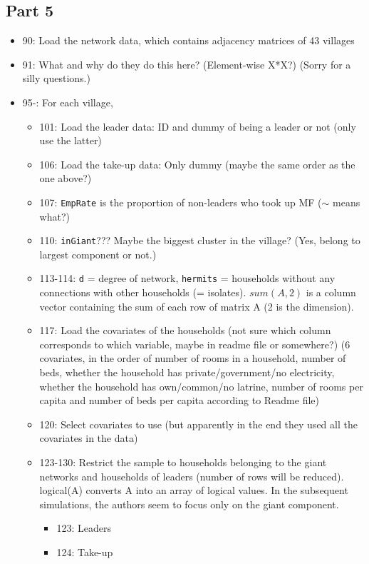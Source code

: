 \documentclass[10pt,letterpaper]{article}
\begin{document}
\subsection*{Part 5}
\begin{itemize}
  \item 90: Load the network data, which contains adjacency matrices of 43 villages
  \item 91: What and why do they do this here? (Element-wise X*X?) (Sorry for a silly questions.)
  \item 95-: For each village,
    \begin{itemize}
      \item 101: Load the leader data: ID and dummy of being a leader or not (only use the latter)
      \item 106: Load the take-up data: Only dummy (maybe the same order as the one above?)
      \item 107: \texttt{EmpRate} is the proportion of non-leaders who took up MF ($\sim$ means what?)
      \item 110: \texttt{inGiant}??? 
        Maybe the biggest cluster in the village? (Yes, belong to largest component or not.)
      \item 113-114: \texttt{d} = degree of network, \texttt{hermits} = households without any connections with other households (= isolates).
        $sum(A,2)$ is a column vector containing the sum of each row of matrix A (2 is the dimension).
      \item 117: Load the covariates of the households (not sure which column corresponds to which variable, maybe in readme file or somewhere?) 
        (6 covariates, in the order of number of rooms in a household, number of beds, whether the household has private/government/no electricity, whether the household has own/common/no latrine, number of rooms per capita and number of beds per capita according to Readme file)
      \item 120: Select covariates to use (but apparently in the end they used all the covariates in the data)
      \item 123-130: Restrict the sample to households belonging to the giant networks and households of leaders (number of rows will be reduced). logical(A) converts A into an array of logical values. In the subsequent simulations, the authors seem to focus only on the giant component.
        \begin{itemize}
          \item 123: Leaders
          \item 124: Take-up

\end{itemize}
\end{itemize}
\end{itemize}
\end{document}
